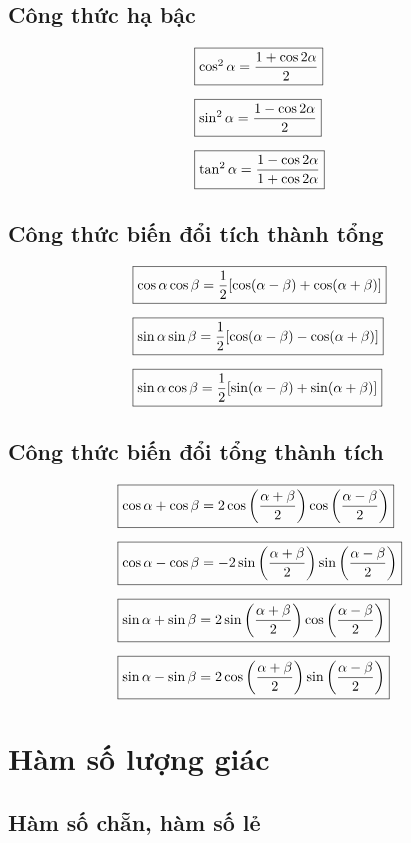 \subsection{Công thức hạ bậc}
\[
    \begin{aligned}
        &\fbox{$\cos^2\alpha=\dfrac{1+\cos2\alpha}{2}$}\\[6pt]
        &\fbox{$\sin^2\alpha=\dfrac{1-\cos2\alpha}{2}$}\\[6pt]
        &\fbox{$\tan^2\alpha=\dfrac{1-\cos2\alpha}{1+\cos2\alpha}$}
    \end{aligned}
\]

\subsection{Công thức biến đổi tích thành tổng}
\[
    \begin{aligned}
        &\fbox{$\cos\alpha\cos\beta=\dfrac{1}{2}[\cos(\alpha-\beta)+\cos(\alpha+\beta)]$}\\[6pt]
        &\fbox{$\sin\alpha\sin\beta=\dfrac{1}{2}[\cos(\alpha-\beta)-\cos(\alpha+\beta)]$}\\[6pt]
        &\fbox{$\sin\alpha\cos\beta=\dfrac{1}{2}[\sin(\alpha-\beta)+\sin(\alpha+\beta)]$}
    \end{aligned}
\]

\subsection{Công thức biến đổi tổng thành tích}
\[
    \begin{aligned}
        &\fbox{$\cos\alpha+\cos\beta=2\cos\left(\dfrac{\alpha+\beta}{2}\right)\cos\left(\dfrac{\alpha-\beta}{2}\right)$}\\[6pt]
        &\fbox{$\cos\alpha-\cos\beta=-2\sin\left(\dfrac{\alpha+\beta}{2}\right)\sin\left(\dfrac{\alpha-\beta}{2}\right)$}\\[6pt]
        &\fbox{$\sin\alpha+\sin\beta=2\sin\left(\dfrac{\alpha+\beta}{2}\right)\cos\left(\dfrac{\alpha-\beta}{2}\right)$}\\[6pt]
        &\fbox{$\sin\alpha-\sin\beta=2\cos\left(\dfrac{\alpha+\beta}{2}\right)\sin\left(\dfrac{\alpha-\beta}{2}\right)$}
    \end{aligned}
\]

\section{Hàm số lượng giác}

\subsection{Hàm số chẵn, hàm số lẻ}

